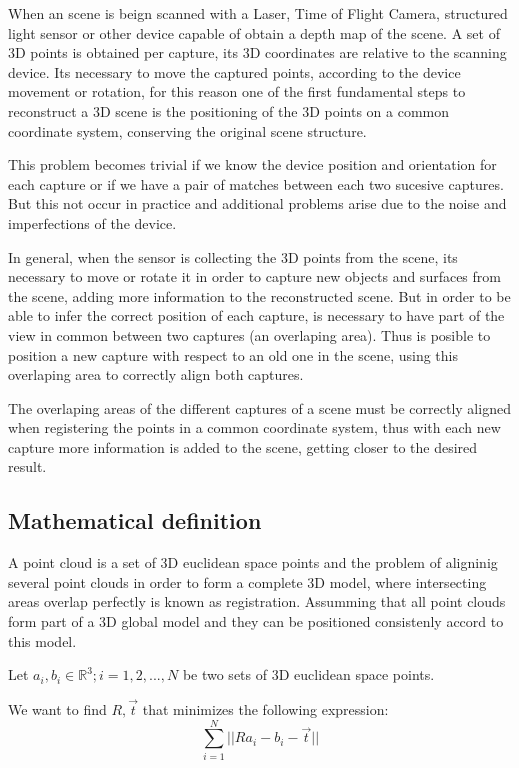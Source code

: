 When an scene is beign scanned with a Laser, Time of Flight Camera, structured 
light sensor or other device capable of obtain a depth map of the scene.
 A set of 3D points is obtained per capture, its 3D coordinates 
are relative to the scanning device. Its necessary to move the captured points, 
according to the device movement or rotation, for this reason 
one of the first fundamental steps to reconstruct a 3D scene is the 
positioning of the 3D points on a common coordinate system, conserving 
the original scene structure. 

This problem becomes trivial if we know the device position and orientation 
for each capture or if we have a pair of matches between each two sucesive 
captures. But this not occur in practice and additional problems arise due 
to the noise and imperfections of the device.


In general, when the sensor is collecting the 3D points from the scene, 
 its necessary to move or rotate it in order to capture new objects and surfaces from 
the scene, adding more information to the reconstructed scene. But in order to be 
able to infer the correct position of each capture, is necessary to have part 
of the view in common between two captures (an overlaping area). Thus is posible to position a new capture with respect to an old one in the scene, using this overlaping 
area to correctly align both captures.
 
The overlaping areas of the different captures of a scene must be correctly 
aligned when registering the points in a common coordinate system, 
thus with each new capture more information is added to the scene, 
getting closer to the desired result. 

\subsection{Mathematical definition}

A point cloud is a set of 3D euclidean space points and the problem of aligninig several point clouds 
in order to form a complete 3D model, where intersecting areas overlap perfectly 
is known as registration. Assumming that all point clouds form part of a 3D global model and they can be 
 positioned  consistenly accord to this model.

Let  ${a_i},{b_i} \in \mathbb{R}^3;i = 1,2,...,N$ be two sets of 3D euclidean space points.

We want to find $R,\vec{t}$ that minimizes the following expression:
$$
\sum\limits_{i=1}^N || Ra_i - b_i - \vec{t} ||
$$

